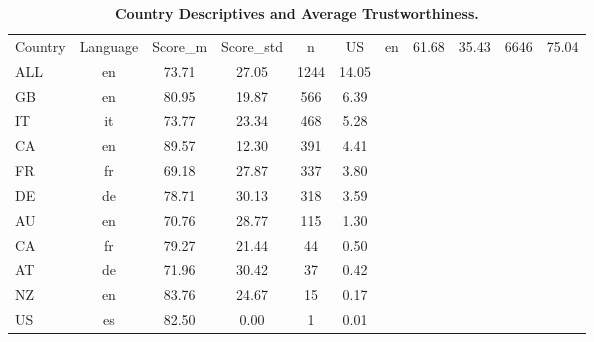 \begin{table}[H]
\centering
\caption{\textbf{Country Descriptives and Average Trustworthiness.}}
\label{table:table1}
\begin{tabular}{lcccccc}
\toprule
Country & Language &  Score_m &  Score_std &    n &     %
\midrule
     US &       en &    61.68 &      35.43 & 6646 & 75.04 \\
    ALL &       en &    73.71 &      27.05 & 1244 & 14.05 \\
     GB &       en &    80.95 &      19.87 &  566 &  6.39 \\
     IT &       it &    73.77 &      23.34 &  468 &  5.28 \\
     CA &       en &    89.57 &      12.30 &  391 &  4.41 \\
     FR &       fr &    69.18 &      27.87 &  337 &  3.80 \\
     DE &       de &    78.71 &      30.13 &  318 &  3.59 \\
     AU &       en &    70.76 &      28.77 &  115 &  1.30 \\
     CA &       fr &    79.27 &      21.44 &   44 &  0.50 \\
     AT &       de &    71.96 &      30.42 &   37 &  0.42 \\
     NZ &       en &    83.76 &      24.67 &   15 &  0.17 \\
     US &       es &    82.50 &       0.00 &    1 &  0.01 \\
\bottomrule
\end{tabular}
\end{table}
